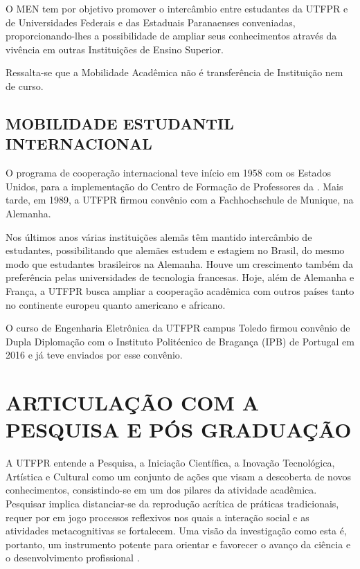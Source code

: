 O MEN tem por objetivo promover o intercâmbio entre estudantes da UTFPR e de Universidades Federais e das Estaduais Paranaenses conveniadas, proporcionando-lhes a possibilidade de ampliar seus conhecimentos através da vivência em outras Instituições de Ensino Superior.

Ressalta-se que a Mobilidade Acadêmica não é transferência de Instituição nem de curso.

\subsection{MOBILIDADE ESTUDANTIL INTERNACIONAL}

O programa de cooperação internacional teve início em 1958 com os Estados Unidos, para a implementação do Centro de Formação de Professores da . Mais tarde, em 1989, a UTFPR firmou convênio com a Fachhochschule de Munique, na Alemanha.

Nos últimos anos várias instituições alemãs têm mantido intercâmbio de estudantes, possibilitando que alemães estudem e estagiem no Brasil, do mesmo modo que estudantes brasileiros na Alemanha. Houve um crescimento também da preferência pelas universidades de tecnologia francesas. Hoje, além de Alemanha e França, a UTFPR busca ampliar a cooperação acadêmica com outros países tanto no continente europeu quanto americano e africano.

O curso de Engenharia Eletrônica da UTFPR campus Toledo firmou convênio de Dupla Diplomação com o Instituto Politécnico de Bragança (IPB) de Portugal em 2016 e já teve  enviados por esse convênio. 


\section{ARTICULAÇÃO COM A PESQUISA E PÓS GRADUAÇÃO}

A UTFPR entende a Pesquisa, a Iniciação Científica, a Inovação Tecnológica, Artística e Cultural como um conjunto de ações que visam a descoberta de novos conhecimentos, consistindo-se em um dos pilares da atividade acadêmica. Pesquisar implica distanciar-se da reprodução acrítica de práticas tradicionais, requer por em jogo processos reflexivos nos quais a interação social e as atividades metacognitivas se fortalecem. Uma visão da investigação como esta é, portanto, um instrumento potente para orientar e favorecer o avanço da ciência e o desenvolvimento profissional \cite{pizzatoconcepccoes}.

